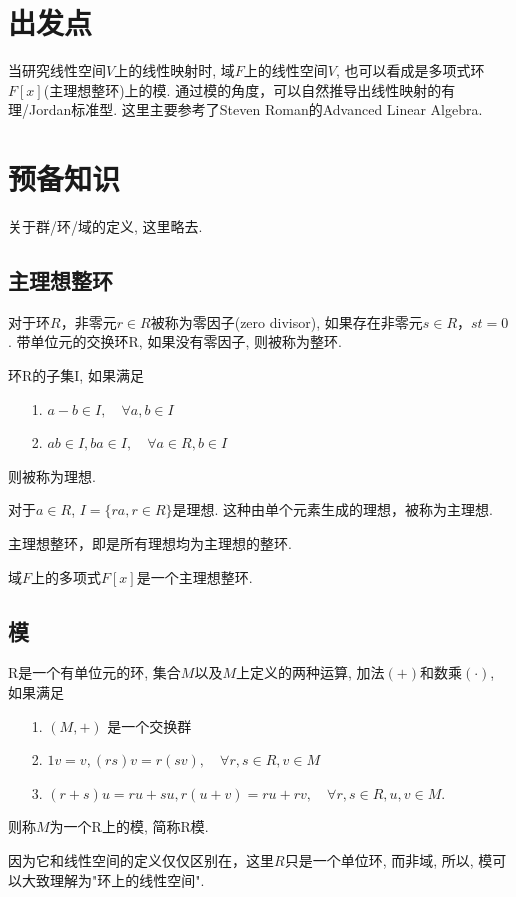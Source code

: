 \section{出发点}
当研究线性空间$V$上的线性映射时, 
域$F$上的线性空间$V$, 也可以看成是多项式环$F[x]$(主理想整环)上的模.
通过模的角度，可以自然推导出线性映射的有理/Jordan标准型.
这里主要参考了Steven Roman的Advanced Linear Algebra.

\section{预备知识}
关于群/环/域的定义, 这里略去.

\subsection{主理想整环}
\begin{definition}
	对于环$R$，非零元$r \in R$被称为零因子(zero divisor),
	如果存在非零元$s \in R，st = 0$. 
	带单位元的交换环R, 如果没有零因子, 则被称为整环.
\end{definition}

\begin{definition}
	环R的子集I, 如果满足
	\begin{itemize}
		\item[1.] $a - b \in I, \quad \forall a,b \in I$
		\item[2.] $ab \in I, ba \in I, \quad \forall a \in R, b \in I$
	\end{itemize}
	则被称为理想. 
\end{definition}
\begin{remark}
	对于$a \in R$, $I = \{ra, r \in R\}$是理想.
	这种由单个元素生成的理想，被称为主理想.
\end{remark}

\begin{definition}
主理想整环，即是所有理想均为主理想的整环.
\end{definition}
\begin{remark}
	域$F$上的多项式$F[x]$是一个主理想整环.
\end{remark}

\subsection{模}
\begin{definition}
R是一个有单位元的环, 集合$M$以及$M$上定义的两种运算,
加法$(+)$和数乘$(\cdot)$, 如果满足
\begin{itemize}
	\item[1.] $(M, +)$ 是一个交换群
	\item[2.] $1v = v, (rs)v = r(sv), \quad \forall r,s \in R, v \in M$
	\item[3.] $(r+s)u = ru + su, r(u+v) = ru + rv, 
	            \quad \forall r,s \in R, u,v \in M.$
\end{itemize}
则称$M$为一个R上的模, 简称R模.
\end{definition}
因为它和线性空间的定义仅仅区别在，这里$R$只是一个单位环, 而非域,
所以,
模可以大致理解为"环上的线性空间".

